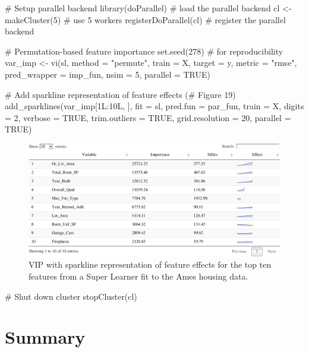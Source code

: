 \begin{Schunk}
\begin{Sinput}
# Setup parallel backend
library(doParallel) # load the parallel backend
cl <- makeCluster(5) # use 5 workers
registerDoParallel(cl) # register the parallel backend

# Permutation-based feature importance
set.seed(278)  # for reproducibility
var_imp <- vi(sl, method = "permute", train = X, target = y, metric = "rmse",
              pred_wrapper = imp_fun, nsim = 5, parallel = TRUE)

# Add sparkline representation of feature effects (# Figure 19)
add_sparklines(var_imp[1L:10L, ], fit = sl, pred.fun = par_fun, train = X,
               digits = 2, verbose = TRUE, trim.outliers = TRUE,
               grid.resolution = 20, parallel = TRUE)
\end{Sinput}
\begin{figure}[!htb]

{\centering \includegraphics[width=1\linewidth]{greenwell-boehmke_files/figure-latex/ames-sparklines-1} 

}

\caption[VIP with sparkline representation of feature effects for the top ten features from a Super Learner fit to the Ames housing data]{VIP with sparkline representation of feature effects for the top ten features from a Super Learner fit to the Ames housing data.}\label{fig:ames-sparklines}
\end{figure}
\begin{Sinput}
# Shut down cluster
stopCluster(cl)
\end{Sinput}
\end{Schunk}

\section{Summary}

